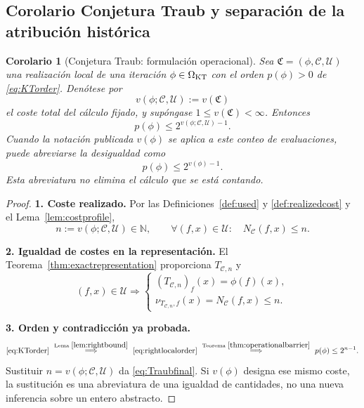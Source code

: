 \documentclass[11pt,a4paper]{article}
\numberwithin{equation}{section}
\newtheorem{corollary}[theorem]{Corolario}
\theoremstyle{definition}
\theoremstyle{remark}
\newcommand{\N}{\mathbb N}
\newcommand{\paso}[1]{\par\smallskip\noindent\textbf{#1}\quad}
\begin{document}
\subsection{Corolario Conjetura Traub y separación de la atribución histórica}
\begin{corollary}[Conjetura Traub: formulación operacional]\label{cor:traub}
Sea $\mathfrak C=(\phi,\mathscr C,\mathcal U)$ una realización local de una iteración $\phi\in\Omega_{\rm KT}$ con el orden $p(\phi)>0$ de \eqref{eq:KTorder}. Denótese por
\[
v(\phi;\mathscr C,\mathcal U):=v(\mathfrak C)
\]
el coste total del cálculo fijado, y supóngase $1\le v(\mathfrak C)<\infty$. Entonces
\begin{equation}\label{eq:Traubfinal}
p(\phi)\le 2^{v(\phi;\mathscr C,\mathcal U)-1}.
\end{equation}
Cuando la notación publicada $v(\phi)$ se aplica a este conteo de evaluaciones, puede abreviarse la desigualdad como
\[
p(\phi)\le2^{v(\phi)-1}.
\]
Esta abreviatura no elimina el cálculo que se está contando.
\end{corollary}
\begin{proof}
\paso{1. Coste realizado.}
Por las Definiciones~\ref{def:used} y \ref{def:realizedcost} y el Lema~\ref{lem:costprofile},
\[
n:=v(\phi;\mathscr C,\mathcal U)\in\N,
\qquad
\forall(f,x)\in\mathcal U:\quad N_{\mathscr C}(f,x)\le n.
\]
\paso{2. Igualdad de costes en la representación.}
El Teorema~\ref{thm:exactrepresentation} proporciona $T_{\mathscr C,n}$ y
\[
(f,x)\in\mathcal U\Longrightarrow
\begin{cases}
(T_{\mathscr C,n})_f(x)=\phi(f)(x),\\
\nu_{T_{\mathscr C,n},f}(x)=N_{\mathscr C}(f,x)\le n.
\end{cases}
\]
\paso{3. Orden y contradicción ya probada.}
\[
\eqref{eq:KTorder}\ \overset{\text{Lema }\ref{lem:rightbound}}{\Longrightarrow}\ \eqref{eq:rightlocalorder}
\ \overset{\text{Teorema }\ref{thm:operationalbarrier}}{\Longrightarrow}\
p(\phi)\le2^{n-1}.
\]
Sustituir $n=v(\phi;\mathscr C,\mathcal U)$ da \eqref{eq:Traubfinal}. Si $v(\phi)$ designa ese mismo coste, la sustitución es una abreviatura de una igualdad de cantidades, no una nueva inferencia sobre un entero abstracto.
\end{proof}
\end{document}
